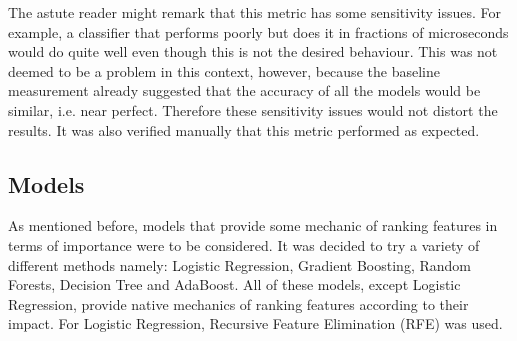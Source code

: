 \documentclass[british]{article}
\begin{document}
	The astute reader might remark that this metric has some sensitivity issues. For example, a classifier that performs poorly but does it in fractions of microseconds would do quite well even though this is not the desired behaviour. This was not deemed to be a problem in this context, however, because the baseline measurement already suggested that the accuracy of all the models would be similar, i.e. near perfect. Therefore these sensitivity issues would not distort the results. It was also verified manually that this metric performed as expected. 
	
	\subsection{Models} As mentioned before, models that provide some mechanic of ranking features in terms of importance were to be considered. It was decided to try a variety of different methods namely: Logistic Regression, Gradient Boosting, Random Forests, Decision Tree and AdaBoost. All of these models, except Logistic Regression, provide native mechanics of ranking features according to their impact. For Logistic Regression, Recursive Feature Elimination (RFE) was used. 
	
	
\end{document}
